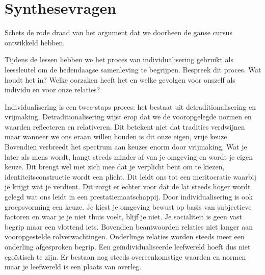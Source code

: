 \documentclass[main.tex]{subfiles}
\begin{document}
\section{Synthesevragen}


\begin{examenvraag}
    \begin{vraag}
        Schets de rode draad van het argument dat we doorheen de ganse cursus ontwikkeld hebben.
    \end{vraag}

    \begin{antwoord}
    \end{antwoord}
\end{examenvraag}


\begin{examenvraag}
    \begin{vraag}
        Tijdens de lessen hebben we het proces van individualisering gebruikt als leessleutel om de hedendaagse samenleving te begrijpen. Bespreek dit proces. Wat houdt het in? Welke oorzaken heeft het en welke gevolgen voor onszelf als individu en voor onze relaties?
    \end{vraag}

    \begin{antwoord}
    Individualisering is een twee-staps proces:‭ ‬het bestaat uit detraditionalisering en vrijmaking.‭ 
    Detraditionalisering wijst erop dat we de vooropgelegde normen en waarden reflecteren en 
    relativeren.‭ ‬Dit betekent niet dat tradities verdwijnen maar wanneer we ons eraan willen houden 
    is dit onze eigen,‭ ‬vrije keuze.‭ ‬Bovendien verbreedt het spectrum aan keuzes enorm door 
    vrijmaking.‭ ‬Wat je later als mens wordt,‭ ‬hangt steeds minder af van je omgeving en wordt je 
    eigen keuze.‭ ‬Dit brengt wel met zich mee dat je verplicht bent om te kiezen,‭ 
    ‬identiteitsconstructie wordt een plicht.‭ ‬Dit leidt ons tot een meritocratie waarbij je krijgt 
    wat je verdient.‭ ‬Dit zorgt er echter voor dat de lat steeds hoger wordt gelegd wat ons leidt in 
    een prestatiemaatschappij.‭ ‬Door individualisering is ook groepsvorming een‭ ‬keuze.‭ ‬Je kiest je 
    omgeving bewust op basis van subjectieve factoren en waar je je niet thuis voelt,‭ ‬blijf je 
    niet.‭ ‬Je socialiteit is geen vast begrip maar een vlottend iets.‭ ‬Bovendien beantwoorden 
    relaties niet langer aan vooropgestelde rolverwachtingen.‭ ‬Onderlinge relaties worden steeds 
    meer een onderling afgesproken begrip.‭ ‬Een geïndividualiseerde leefwereld hoeft dus niet 
    egoïstisch te zijn.‭ ‬Er bestaan nog steeds overeenkomstige waarden en normen maar je leefwereld 
    is een plaats van overleg.
    \end{antwoord}
\end{examenvraag}
\end{document}
